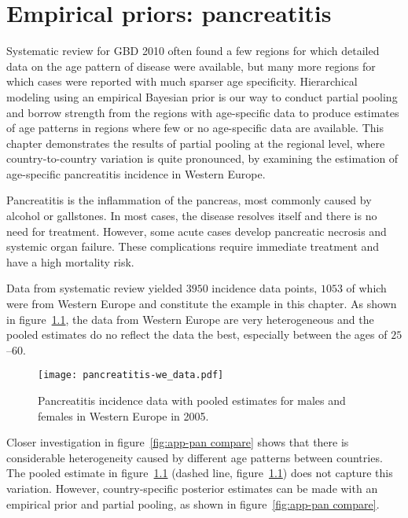 \chapter{Empirical priors: pancreatitis}
\label{applications-priors_empirical}

Systematic review for GBD 2010 often found a few regions for
which detailed data on the age pattern of disease were available, but
many more regions for which cases were reported with much sparser
age specificity.  Hierarchical modeling using an empirical Bayesian
prior is our way to conduct partial pooling and borrow strength from
the regions with age-specific data to produce estimates of age
patterns in regions where few or no age-specific data are
available.  This chapter demonstrates the results of partial pooling
at the regional level, where country-to-country variation is quite
pronounced, by examining the estimation of age-specific pancreatitis
incidence in Western Europe.

Pancreatitis is the inflammation of the pancreas, most commonly
caused by alcohol or gallstones.  In most cases, the disease resolves
itself and there is no need for treatment.  However, some acute
cases develop pancreatic necrosis and systemic organ failure.  These
complications require immediate treatment and have a high mortality risk.
\cite{raraty_acute_2004, banks_epidemiology_2002, sekimoto_jpn_2006}

Data from systematic review yielded $3950$ incidence data points,
$1053$ of which were from Western Europe and constitute the example
in this chapter.  As shown in figure~\ref{fig:app-pan data}, the data
from Western Europe are very heterogeneous and the pooled estimates do
no reflect the data the best, especially between the ages of $25$--$60$.

    \begin{figure}[h]
        \begin{center}
            \texttt{[image: pancreatitis-we\_data.pdf]}
            \caption[Systematic review data for pancreatitis with estimates.]{Pancreatitis incidence data with pooled estimates for males and females in Western
            Europe in 2005.}
            \label{fig:app-pan data}
        \end{center}
    \end{figure}

Closer investigation in figure~\ref{fig:app-pan compare} shows that there is
considerable heterogeneity caused by different age patterns between countries.
The pooled estimate in figure~\ref{fig:app-pan data} (dashed line,
figure~\ref{fig:app-pan data}) does not capture this variation.  However,
country-specific posterior estimates can be made with an empirical prior and
partial pooling, as shown in figure~\ref{fig:app-pan compare}.

